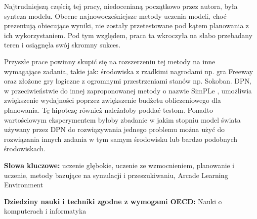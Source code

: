 Najtrudniejszą częścią tej pracy, niedocenianą początkowo przez autora, była synteza modelu. Obecne najnowocześniejsze metody uczenia modeli, choć prezentują obiecujące wyniki, nie zostały przetestowane pod kątem planowania z ich wykorzystaniem. Pod tym względem, praca ta wkroczyła na słabo przebadany teren i osiągnęła swój skromny sukces.

Przyszłe prace powinny skupić się na rozszerzeniu tej metody na inne wymagające zadania, takie jak: środowiska z rzadkimi nagrodami np. gra Freeway oraz złożone gry logiczne z ogromnymi przestrzeniami stanów np. Sokoban.
DPN, w przeciwieństwie do innej zaproponowanej metody o nazwie SimPLe \cite{Algo.SimPLe}, umożliwia zwiększenie wydajności poprzez zwiększenie budżetu obliczeniowego dla planowania. Tę hipotezę również należałoby poddać testom.
Ponadto wartościowym eksperymentem byłoby zbadanie w jakim stopniu model świata używany przez DPN do rozwiązywania jednego problemu można użyć do rozwiązania innych zadania w tym samym środowisku lub bardzo podobnych środowiskach.

\vspace{1cm}
\noindent
\textbf{Słowa kluczowe:} uczenie głębokie, uczenie ze wzmocnieniem, planowanie i uczenie, metody bazujące na symulacji i przeszukiwaniu, Arcade Learning Environment

\vspace{1cm}
\noindent
\textbf{Dziedziny nauki i techniki zgodne z wymogami OECD:} Nauki o komputerach i informatyka
